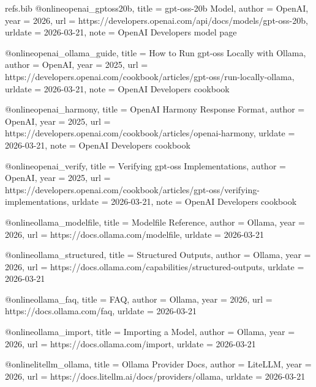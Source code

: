 \begin{filecontents*}{refs.bib}
    @online{openai_gptoss20b,
      title   = {gpt-oss-20b Model},
      author  = {{OpenAI}},
      year    = {2026},
      url     = {https://developers.openai.com/api/docs/models/gpt-oss-20b},
      urldate = {2026-03-21},
      note    = {OpenAI Developers model page}
    }
    
    @online{openai_ollama_guide,
      title   = {How to Run gpt-oss Locally with Ollama},
      author  = {{OpenAI}},
      year    = {2025},
      url     = {https://developers.openai.com/cookbook/articles/gpt-oss/run-locally-ollama},
      urldate = {2026-03-21},
      note    = {OpenAI Developers cookbook}
    }
    
    @online{openai_harmony,
      title   = {OpenAI Harmony Response Format},
      author  = {{OpenAI}},
      year    = {2025},
      url     = {https://developers.openai.com/cookbook/articles/openai-harmony},
      urldate = {2026-03-21},
      note    = {OpenAI Developers cookbook}
    }
    
    @online{openai_verify,
      title   = {Verifying gpt-oss Implementations},
      author  = {{OpenAI}},
      year    = {2025},
      url     = {https://developers.openai.com/cookbook/articles/gpt-oss/verifying-implementations},
      urldate = {2026-03-21},
      note    = {OpenAI Developers cookbook}
    }
    
    @online{ollama_modelfile,
      title   = {Modelfile Reference},
      author  = {{Ollama}},
      year    = {2026},
      url     = {https://docs.ollama.com/modelfile},
      urldate = {2026-03-21}
    }
    
    @online{ollama_structured,
      title   = {Structured Outputs},
      author  = {{Ollama}},
      year    = {2026},
      url     = {https://docs.ollama.com/capabilities/structured-outputs},
      urldate = {2026-03-21}
    }
    
    @online{ollama_faq,
      title   = {FAQ},
      author  = {{Ollama}},
      year    = {2026},
      url     = {https://docs.ollama.com/faq},
      urldate = {2026-03-21}
    }
    
    @online{ollama_import,
      title   = {Importing a Model},
      author  = {{Ollama}},
      year    = {2026},
      url     = {https://docs.ollama.com/import},
      urldate = {2026-03-21}
    }
    
    @online{litellm_ollama,
      title   = {Ollama Provider Docs},
      author  = {{LiteLLM}},
      year    = {2026},
      url     = {https://docs.litellm.ai/docs/providers/ollama},
      urldate = {2026-03-21}
    }
    

\end{filecontents*}
